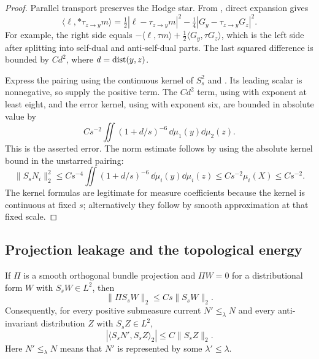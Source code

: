 \begin{proof}
Parallel transport preserves the Hodge star.  From
, direct expansion gives
\begin{equation}\label{eq:current-angular-identity}
 \langle\ell,*\tau_{z\to y}m\rangle
 =\tfrac12|\ell-\tau_{z\to y}m|^2
       -\tfrac14|G_y-\tau_{z\to y}G_z|^2.
\end{equation}
For example, the right side equals
$-\langle\ell,\tau m\rangle+\tfrac12\langle G_y,\tau G_z\rangle$,
which is the left side after splitting into self-dual and anti-self-dual
parts.  The last squared difference is bounded by $Cd^2$, where
$d=\operatorname{dist}(y,z)$.

Express the pairing using the continuous kernel of $S_s^2$ and
.  Its leading scalar is nonnegative, so
 supply the
positive term.  The $Cd^2$ term, using
 with exponent at least eight, and the
error kernel, using  with exponent six,
are bounded in absolute value by
\[
 Cs^{-2}\iint(1+d/s)^{-6}\,\dd\mu_1(y)\dd\mu_2(z).
\]
This is the asserted error.  The norm estimate follows by using the
absolute kernel bound in the unstarred pairing:
\[
 \|S_sN_i\|_2^2
 \le Cs^{-4}\iint(1+d/s)^{-6}\,\dd\mu_i(y)\dd\mu_i(z)
 \le Cs^{-2}\mu_i(X)\le Cs^{-2}.
\]
The kernel formulas are legitimate for measure coefficients because the
kernel is continuous at fixed $s$; alternatively they follow by smooth
approximation at that fixed scale.
\end{proof}

\subsection{Projection leakage and the topological energy}

\begin{lemma}\label{lem:current-commutator}
If $\Pi$ is a smooth orthogonal bundle projection and $\Pi W=0$ for a
distributional form $W$ with $S_sW\in L^2$, then
\begin{equation}\label{eq:current-projection-leakage}
 \|\Pi S_sW\|_2\le Cs\|S_sW\|_2.
\end{equation}
Consequently, for every positive submeasure current $N'\le_\lambda N$
and every anti-invariant distribution $Z$ with $S_sZ\in L^2$,
\begin{equation}\label{eq:current-mixed-bound}
 |\langle S_sN',S_sZ\rangle_2|\le C\|S_sZ\|_2.
\end{equation}
Here $N'\le_\lambda N$ means that $N'$ is represented by some
$\lambda'\le\lambda$.
\end{lemma}

